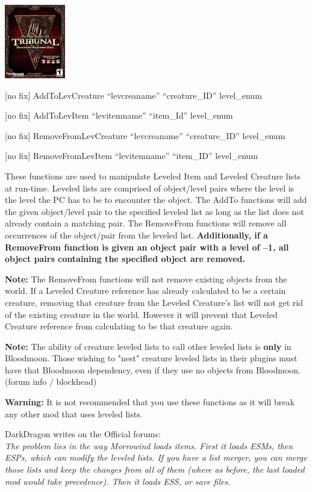 \includegraphics{media/image6.png}

{[}no fix{]} AddToLevCreature ``levcreaname'' ``creature\_ID''
level\_enum

{[}no fix{]} AddToLevItem ``levitemname'' ``item\_Id'' level\_enum

{[}no fix{]} RemoveFromLevCreature ``levcreaname'' ``creature\_ID''
level\_enum

{[}no fix{]} RemoveFromLevItem ``levitemname'' ``item\_ID'' level\_enum

These functions are used to manipulate Leveled Item and Leveled Creature
lists at run-time. Leveled lists are comprised of object/level pairs
where the level is the level the PC has to be to encounter the object.
The AddTo functions will add the given object/level pair to the
specified leveled list as long as the list does not already contain a
matching pair. The RemoveFrom functions will remove all occurrences of
the object/pair from the leveled list. \textbf{Additionally, if a
RemoveFrom function is given an object pair with a level of --1, all
object pairs containing the specified object are removed.}

\textbf{Note:} The RemoveFrom functions will not remove existing objects
from the world. If a Leveled Creature reference has already calculated
to be a certain creature, removing that creature from the Leveled
Creature's list will not get rid of the existing creature in the world.
However it will prevent that Leveled Creature reference from calculating
to be that creature again.

\textbf{Note:} The ability of creature leveled lists to call other
leveled lists is \textbf{only} in Bloodmoon. Those wishing to "nest"
creature leveled lists in their plugins must have that Bloodmoon
dependency, even if they use no objects from Bloodmoon. (forum info /
blockhead)

\textbf{Warning:} It is not recommended that you use these functions as
it will break any other mod that uses leveled lists.

DarkDragon writes on the Official forums:\\
\emph{The problem lies in the way Morrowind loads items. First it loads
ESMs, then ESPs, which can modify the leveled lists. If you have a list
merger, you can merge those lists and keep the changes from all of them
(where as before, the last loaded mod would take precedence). Then it
loads ESS, or save files.}

